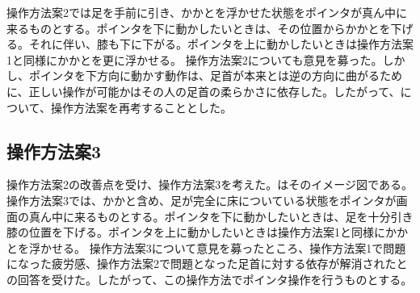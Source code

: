 操作方法案2では足を手前に引き、かかとを浮かせた状態をポインタが真ん中に来るものとする。ポインタを下に動かしたいときは、その位置からかかとを下げる。それに伴い、膝も下に下がる。ポインタを上に動かしたいときは操作方法案1と同様にかかとを更に浮かせる。
操作方法案2についても意見を募った。しかし、ポインタを下方向に動かす動作は、足首が本来とは逆の方向に曲がるために、正しい操作が可能かはその人の足首の柔らかさに依存した。したがって、について、操作方法案を再考することとした。
\subsection{操作方法案3}
操作方法案2の改善点を受け、操作方法案3を考えた。はそのイメージ図である。
操作方法案3では、かかと含め、足が完全に床についている状態をポインタが画面の真ん中に来るものとする。ポインタを下に動かしたいときは、足を十分引き膝の位置を下げる。ポインタを上に動かしたいときは操作方法案1と同様にかかとを浮かせる。
操作方法案3について意見を募ったところ、操作方法案1で問題になった疲労感、操作方法案2で問題となった足首に対する依存が解消されたとの回答を受けた。したがって、この操作方法でポインタ操作を行うものとする。
